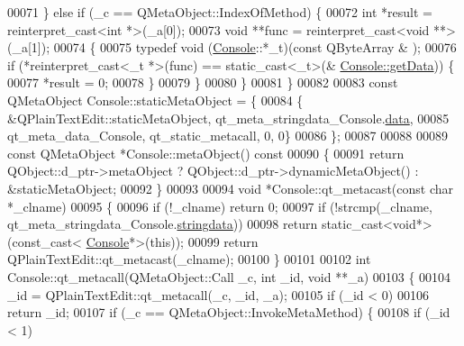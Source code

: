 \begin{DoxyCode}
00071     \} \textcolor{keywordflow}{else} \textcolor{keywordflow}{if} (\_c == QMetaObject::IndexOfMethod) \{
00072         \textcolor{keywordtype}{int} *result = \textcolor{keyword}{reinterpret\_cast<}\textcolor{keywordtype}{int} *\textcolor{keyword}{>}(\_a[0]);
00073         \textcolor{keywordtype}{void} **func = \textcolor{keyword}{reinterpret\_cast<}\textcolor{keywordtype}{void} **\textcolor{keyword}{>}(\_a[1]);
00074         \{
00075             \textcolor{keyword}{typedef} void (\hyperlink{a00002}{Console}::*\_t)(\textcolor{keyword}{const} QByteArray & );
00076             \textcolor{keywordflow}{if} (*reinterpret\_cast<\_t *>(func) == \textcolor{keyword}{static\_cast<}\_t\textcolor{keyword}{>}(&
      \hyperlink{a00002_a1976aad46ce1a77be730bc628275038f}{Console::getData})) \{
00077                 *result = 0;
00078             \}
00079         \}
00080     \}
00081 \}
00082 
00083 \textcolor{keyword}{const} QMetaObject Console::staticMetaObject = \{
00084     \{ &QPlainTextEdit::staticMetaObject, qt\_meta\_stringdata\_Console.\hyperlink{a00013_af7131d57b034ad13a178d273cfee74c2}{data},
00085       qt\_meta\_data\_Console,  qt\_static\_metacall, 0, 0\}
00086 \};
00087 
00088 
00089 \textcolor{keyword}{const} QMetaObject *Console::metaObject()\textcolor{keyword}{ const}
00090 \textcolor{keyword}{}\{
00091     \textcolor{keywordflow}{return} QObject::d\_ptr->metaObject ? QObject::d\_ptr->dynamicMetaObject() : &staticMetaObject;
00092 \}
00093 
00094 \textcolor{keywordtype}{void} *Console::qt\_metacast(\textcolor{keyword}{const} \textcolor{keywordtype}{char} *\_clname)
00095 \{
00096     \textcolor{keywordflow}{if} (!\_clname) \textcolor{keywordflow}{return} 0;
00097     \textcolor{keywordflow}{if} (!strcmp(\_clname, qt\_meta\_stringdata\_Console.\hyperlink{a00013_a63ab346e732e08dad62cdef78b05d53d}{stringdata}))
00098         \textcolor{keywordflow}{return} \textcolor{keyword}{static\_cast<}\textcolor{keywordtype}{void}*\textcolor{keyword}{>}(\textcolor{keyword}{const\_cast<} \hyperlink{a00002}{Console}*\textcolor{keyword}{>}(\textcolor{keyword}{this}));
00099     \textcolor{keywordflow}{return} QPlainTextEdit::qt\_metacast(\_clname);
00100 \}
00101 
00102 \textcolor{keywordtype}{int} Console::qt\_metacall(QMetaObject::Call \_c, \textcolor{keywordtype}{int} \_id, \textcolor{keywordtype}{void} **\_a)
00103 \{
00104     \_id = QPlainTextEdit::qt\_metacall(\_c, \_id, \_a);
00105     \textcolor{keywordflow}{if} (\_id < 0)
00106         \textcolor{keywordflow}{return} \_id;
00107     \textcolor{keywordflow}{if} (\_c == QMetaObject::InvokeMetaMethod) \{
00108         \textcolor{keywordflow}{if} (\_id < 1)

\end{DoxyCode}
